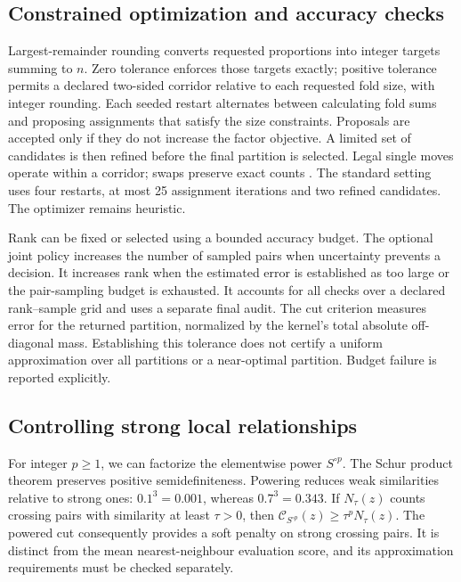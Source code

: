 \documentclass[12pt]{article}
\newcommand{\cut}{\mathcal{C}}
\begin{document}
\subsection{Constrained optimization and accuracy checks}

Largest-remainder rounding converts requested proportions into integer targets
summing to $n$. Zero tolerance enforces those targets exactly; positive
tolerance permits a declared two-sided corridor relative to each requested fold size,
with integer rounding. Each seeded restart alternates
between calculating fold sums and proposing assignments that satisfy the size
constraints. Proposals are accepted only if they do not increase the factor
objective. A limited set of candidates is then refined before the final
partition is selected. Legal single moves operate within a corridor; swaps
preserve exact counts \citep{fiduccia1982,kernighan1970}. The standard setting
uses four restarts, at most 25 assignment iterations and two refined
candidates. The optimizer remains heuristic.

Rank can be fixed or selected using a bounded accuracy budget. The optional
joint policy increases the number of sampled pairs when uncertainty prevents a
decision. It increases rank when the estimated error is established as too
large or the pair-sampling budget is exhausted. It accounts for all checks over
a declared rank--sample grid and uses a separate final audit. The cut criterion
measures error for the returned partition, normalized by the kernel's total
absolute off-diagonal mass. Establishing this tolerance does not certify a
uniform approximation over all partitions or a near-optimal partition. Budget
failure is reported explicitly.

\subsection{Controlling strong local relationships}

For integer $p\ge1$, we can factorize the elementwise power $S^{\circ p}$. The
Schur product theorem preserves positive semidefiniteness. Powering reduces
weak similarities relative to strong ones: $0.1^3=0.001$, whereas
$0.7^3=0.343$. If $N_\tau(z)$ counts crossing pairs with similarity at least
$\tau>0$, then $\cut_{S^{\circ p}}(z)\ge\tau^pN_\tau(z)$. The powered cut
consequently provides a soft penalty on strong crossing pairs. It is distinct
from the mean nearest-neighbour evaluation score, and its approximation
requirements must be checked separately.
\end{document}
